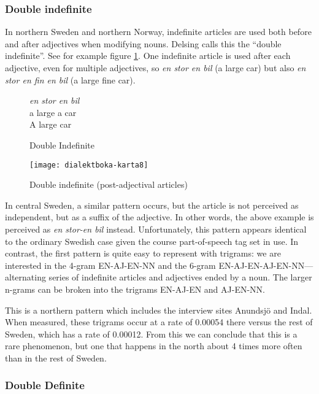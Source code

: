 \subsubsection{Double indefinite}

In northern Sweden and northern Norway, indefinite articles are used both
before and after adjectives when modifying nouns. Delsing calls this
the ``double indefinite''. See for example figure
\ref{double-indefinite-example}. One indefinite article is used after
each adjective, even for multiple adjectives, so {\it en stor en bil}
(a large car) but also {\it en stor en fin en bil} (a large fine car).

\begin{figure}
  {\it en stor en bil} \\
  a large a car \\
  A large car
  \caption{Double Indefinite}
  \label{double-indefinite-example}
\end{figure}

\begin{figure}
  \texttt{[image: dialektboka-karta8]}
  \caption{Double indefinite (post-adjectival articles)}
  \label{double-indefinite-map}
\end{figure}

In central Sweden, a similar pattern occurs, but the article is not
perceived as independent, but as a suffix of the adjective. In other
words, the above example is perceived as {\it en stor-en bil}
instead. Unfortunately, this pattern appears identical to the ordinary
Swedish case given the course part-of-speech tag set in use.
In contrast, the first pattern is quite easy to represent with
trigrams: we are interested in the 4-gram EN-AJ-EN-NN and the 6-gram
EN-AJ-EN-AJ-EN-NN---alternating series of indefinite articles and
adjectives ended by a noun. The larger n-grams can be broken into the
trigrams EN-AJ-EN and AJ-EN-NN.

This is a northern pattern which includes the interview sites
Anundsj\"o and Indal. When measured, these trigrams occur at a rate of
0.00054 there versus the rest of Sweden, which has a rate of
0.00012. From this we can conclude that this is a rare phenomenon, but
one that happens in the north about 4 times more often than in the
rest of Sweden.

\subsubsection{Double Definite}


